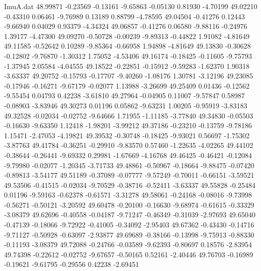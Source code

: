 \begin{filecontents}{ImuA.dat}
  48.99871   -0.23569   -0.13161   -9.65863   -0.05130    0.81930   -4.70199
  49.02210   -0.43310    0.06461   -9.76989    0.13189    0.88799   -4.78595
  49.04504   -0.41276    0.12443   -9.66940    0.04029    0.93379   -4.34324
  49.06857   -0.41276    0.06580   -9.88116   -0.24976    1.39177   -4.47300
  49.09270   -0.50728   -0.00239   -9.89313   -0.44822    1.91082   -4.81649
  49.11585   -0.52642    0.10289   -9.85364   -0.66958    1.94898   -4.81649
  49.13830   -0.30628   -0.12802   -9.76870   -1.30312    1.75052   -4.53406
  49.16174   -0.18425   -0.11605   -9.75793   -1.37945    2.05584   -4.04555
  49.18522   -0.22851   -0.15912   -9.59283   -1.62370    1.90318   -3.63337
  49.20752   -0.15793   -0.17707   -9.40260   -1.08176    1.30781   -3.12196
  49.23085   -0.17946   -0.16271   -9.67179   -0.02077    1.13988   -3.26699
  49.25409    0.01436   -0.12562   -9.55454    0.04793    0.42238   -3.61810
  49.27964   -0.04905    0.11007   -9.57847    0.58987   -0.08903   -3.83946
  49.30273    0.01196    0.05862   -9.63231    1.00205   -0.95919   -3.83183
  49.32528   -0.02034   -0.02752   -9.64666    1.71955   -1.11185   -3.77840
  49.34830   -0.05503   -0.16630   -9.63350    1.12418   -1.98201   -3.99212
  49.37186   -0.23210   -0.13759   -9.78186    1.15471   -2.47053   -4.19821
  49.39532   -0.30748   -0.18425   -9.93021    0.56697   -1.75302   -3.87763
  49.41784   -0.36251   -0.29910   -9.83570    0.57460   -1.22635   -4.02265
  49.44102   -0.38644   -0.26441   -9.69332    0.29981   -1.67669   -4.16768
  49.46425   -0.46421   -0.12084   -9.79980   -0.02077   -1.20345   -3.71733
  49.48861   -0.50967   -0.18664   -9.88475   -0.07420   -0.89813   -3.54177
  49.51189   -0.37089   -0.07777   -9.57249   -0.70011   -0.66151   -3.59521
  49.53506   -0.41515   -0.02034   -9.70529   -0.38716   -0.52411   -3.63337
  49.55828   -0.25484    0.01196   -9.59163   -0.62378   -0.61571   -3.31278
  49.58061   -0.24168   -0.08016   -9.73998   -0.56271   -0.50121   -3.20592
  49.60478   -0.20100   -0.16630   -9.68974   -0.61615   -0.33329   -3.08379
  49.62696   -0.40558   -0.04187   -9.71247   -0.46349   -0.31039   -2.97693
  49.65040   -0.47139   -0.18066   -9.72922   -0.41005   -0.34092   -2.95403
  49.67362   -0.43430   -0.14716   -9.71127   -0.50928   -0.63097   -2.93877
  49.69689   -0.38166   -0.13998   -9.75913   -0.88330   -0.11193   -3.08379
  49.72088   -0.24766   -0.03589   -9.62393   -0.80697    0.18576   -2.83954
  49.74398   -0.22612   -0.02752   -9.67657   -0.50165    0.52161   -2.40446
  49.76703   -0.16989   -0.19621   -9.61795   -0.29556    0.42238   -2.69451

\end{filecontents}

